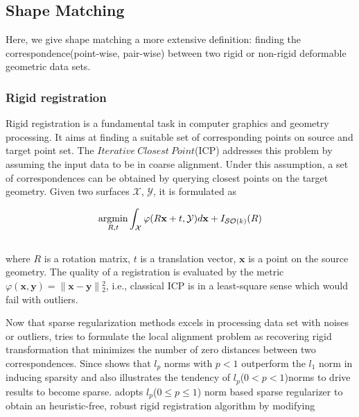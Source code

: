\subsection{Shape Matching}
\label{subsec:Shape Matching}


Here, we give shape matching a more extensive definition: finding the correspondence(point-wise, pair-wise) between two rigid or non-rigid deformable geometric data sets.

\subsubsection{Rigid registration}
\label{subsubsec:Rigid registration}

Rigid registration is a fundamental task in computer graphics and geometry processing.
It aims at finding a suitable set of corresponding points on source and target point set.
The $Iterative~Closest~Point$(ICP) addresses this problem by assuming the input data to be in coarse alignment.
Under this assumption, a set of correspondences can be obtained by querying closest points on the target geometry.
Given two surfaces $\mathcal{X}$, $\mathcal{Y}$, it is formulated as

\small{
\begin{equation}
 \label{eq:ICP}
 \mathop{\operatorname*{argmin}}_{R,t}\int_{\mathcal{X}}^{}\varphi(R\mathbf{x}+t,\mathcal{Y})d\mathbf{x}+I_{\mathcal{SO}(k)}(R)
\end{equation}
}
\\
where $R$ is a rotation matrix,
$t$ is a translation vector,
$\mathbf{x}$ is a point on the source geometry.
The quality of a registration is evaluated by the metric $\varphi(\mathbf{x},\mathbf{y})=\|\mathbf{x}-\mathbf{y}\|{_2^2}$, i.e., classical ICP is in a least-square sense which would fail with outliers.

Now that sparse regularization methods excels in processing data set with noises or outliers,
\cite{bouaziz2013sparse} tries to formulate the local alignment problem as recovering rigid transformation that minimizes the number of zero distances between two correspondences.
Since \cite{chartrand2007exact} shows that $l_{p}$ norms with $p<1$ outperform the $l_1$ norm in inducing sparsity and \cite{elad2010sparse} also illustrates the tendency of $l_{p}$($0<p<1$)norms to drive results to become sparse.
\cite{bouaziz2013sparse} adopts $l_{p}$($0\le p\le1$) norm based sparse regularizer to obtain an heuristic-free, robust rigid registration algorithm by modifying

